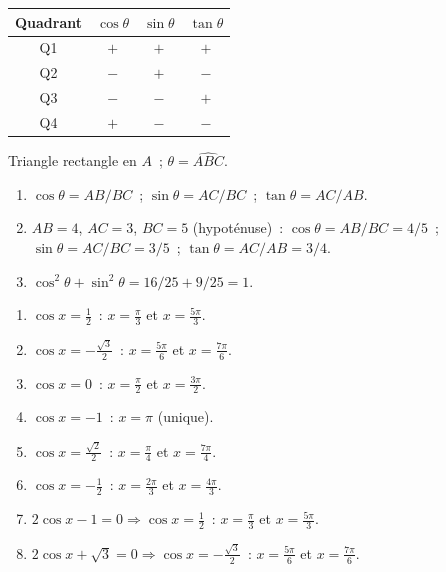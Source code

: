 \begin{center}
\begin{tabular}{|c|c|c|c|}
\hline
Quadrant & $\cos\theta$ & $\sin\theta$ & $\tan\theta$ \\\hline
Q1 & $+$ & $+$ & $+$ \\
Q2 & $-$ & $+$ & $-$ \\
Q3 & $-$ & $-$ & $+$ \\
Q4 & $+$ & $-$ & $-$ \\\hline
\end{tabular}
\end{center}


Triangle rectangle en $A$~; $\theta=\widehat{ABC}$.
\begin{enumerate}
  \item $\cos\theta=AB/BC$~; $\sin\theta=AC/BC$~; $\tan\theta=AC/AB$.
  \item $AB=4$, $AC=3$, $BC=5$ (hypot\'enuse)~: $\cos\theta=AB/BC=4/5$~; $\sin\theta=AC/BC=3/5$~; $\tan\theta=AC/AB=3/4$.
  \item $\cos^2\theta+\sin^2\theta=16/25+9/25=1$.\checkmark
\end{enumerate}


\begin{enumerate}
  \item $\cos x=\frac{1}{2}$~: $x=\frac{\pi}{3}$ et $x=\frac{5\pi}{3}$.
  \item $\cos x=-\frac{\sqrt{3}}{2}$~: $x=\frac{5\pi}{6}$ et $x=\frac{7\pi}{6}$.
  \item $\cos x=0$~: $x=\frac{\pi}{2}$ et $x=\frac{3\pi}{2}$.
  \item $\cos x=-1$~: $x=\pi$ (unique).
  \item $\cos x=\frac{\sqrt{2}}{2}$~: $x=\frac{\pi}{4}$ et $x=\frac{7\pi}{4}$.
  \item $\cos x=-\frac{1}{2}$~: $x=\frac{2\pi}{3}$ et $x=\frac{4\pi}{3}$.
  \item $2\cos x-1=0\Rightarrow\cos x=\frac{1}{2}$~: $x=\frac{\pi}{3}$ et $x=\frac{5\pi}{3}$.
  \item $2\cos x+\sqrt{3}=0\Rightarrow\cos x=-\frac{\sqrt{3}}{2}$~: $x=\frac{5\pi}{6}$ et $x=\frac{7\pi}{6}$.
\end{enumerate}

